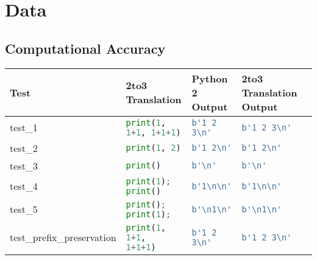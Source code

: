 \section{Data}
\label{appendix:Data}
\subsection{Computational Accuracy}

\begin{table}[ht]
    \begin{tabular}{@{}l|llll@{}}
    \toprule
    Test                                  & 2to3 Translation                      & Python 2 Output                               & 2to3 Translation Output                       \\ \hline
    test\_1                               & \lstinline[language=Python, style=pythonstyle]|print(1, 1+1, 1+1+1)                 | & \lstinline[language=Python, style=pythonstyle]|b'1 2 3\n'             | & \lstinline[language=Python, style=pythonstyle]|b'1 2 3\n'             | \\ 
    test\_2                               & \lstinline[language=Python, style=pythonstyle]|print(1, 2)                          | & \lstinline[language=Python, style=pythonstyle]|b'1 2\n'               | & \lstinline[language=Python, style=pythonstyle]|b'1 2\n'               | \\ 
    test\_3                               & \lstinline[language=Python, style=pythonstyle]|print()                              | & \lstinline[language=Python, style=pythonstyle]|b'\n'                  | & \lstinline[language=Python, style=pythonstyle]|b'\n'                  | \\ 
    test\_4                               & \lstinline[language=Python, style=pythonstyle]|print(1); print()                    | & \lstinline[language=Python, style=pythonstyle]|b'1\n\n'| & \lstinline[language=Python, style=pythonstyle]|b'1\n\n'| \\ 
    test\_5                               & \lstinline[language=Python, style=pythonstyle]|print(); print(1);                   | & \lstinline[language=Python, style=pythonstyle]|b'\n1\n'| & \lstinline[language=Python, style=pythonstyle]|b'\n1\n'| \\ 
    test\_prefix\_preservation            & \lstinline[language=Python, style=pythonstyle]|print(1,   1+1,   1+1+1)             | & \lstinline[language=Python, style=pythonstyle]|b'1 2 3\n'             | & \lstinline[language=Python, style=pythonstyle]|b'1 2 3\n'             | \\ 

\end{tabular}
\end{table}
